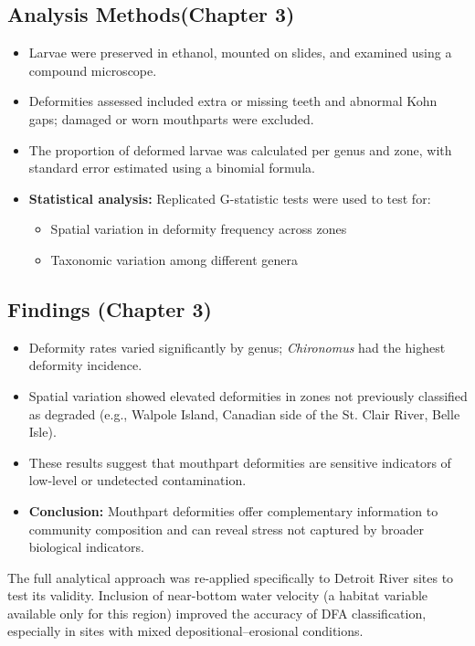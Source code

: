 \subsection{Analysis Methods(Chapter 3)}
\begin{itemize}
  \item Larvae were preserved in ethanol, mounted on slides, and examined using a compound microscope.
  \item Deformities assessed included extra or missing teeth and abnormal Kohn gaps; damaged or worn mouthparts were excluded.
  \item The proportion of deformed larvae was calculated per genus and zone, with standard error estimated using a binomial formula.
  \item \textbf{Statistical analysis:} Replicated G-statistic tests were used to test for:
  \begin{itemize}
    \item Spatial variation in deformity frequency across zones
    \item Taxonomic variation among different genera
  \end{itemize}
\end{itemize}

\subsection{Findings (Chapter 3)}
\begin{itemize}
  \item Deformity rates varied significantly by genus; \textit{Chironomus} had the highest deformity incidence.
  \item Spatial variation showed elevated deformities in zones not previously classified as degraded (e.g., Walpole Island, Canadian side of the St. Clair River, Belle Isle).
  \item These results suggest that mouthpart deformities are sensitive indicators of low-level or undetected contamination.
  \item \textbf{Conclusion:} Mouthpart deformities offer complementary information to community composition and can reveal stress not captured by broader biological indicators.
\end{itemize}

The full analytical approach was re-applied specifically to Detroit River sites to test its validity. Inclusion of near-bottom water velocity (a habitat variable available only for this region) improved the accuracy of DFA classification, especially in sites with mixed depositional–erosional conditions.

